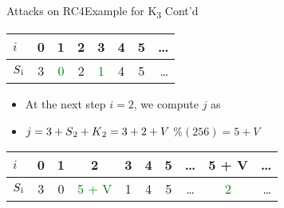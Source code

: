 \documentclass[
	aspectratio=169,	%
	onlytextwidth,		%
	t,					%
	]{beamer}
\begin{document}
\begin{frame}[fragile]{Attacks on RC4}{Example for K\textsubscript{3} Cont'd}

	\begin{table}[h!]
		\begin{center}
			\begin{tabular}{l|c|c|c|c|c|c|r}
			$i$ & 0 & 1 & 2 & 3 & 4 & 5 & \dots\\
			\hline
			$S\textsubscript{i}$ & 3 & \textcolor{green}{0} & 2 & \textcolor{green}{1} & 4 & 5 & \dots\\
			\end{tabular}
		\end{center}
	\end{table}

	\begin{itemize}
		\item At the next step $i = 2$, we compute $j$ as
		\item $j = 3 + S\textsubscript{2} + K\textsubscript{2} = 3 + 2 + V$ $\% (256) = 5+V$
	\end{itemize}

	\begin{table}[h!]
		\begin{center}
			\begin{tabular}{l|c|c|c|c|c|c|c|c|r}
			$i$ & 0 & 1 & 2 & 3 & 4 & 5 & \dots & 5 + V & \dots\\
			\hline
			$S\textsubscript{i}$ & 3 & 0 & \textcolor{green}{5 + V} & 1 & 4 & 5 & \dots & \textcolor{green}{2} & \dots\\
			\end{tabular}
		\end{center}
	\end{table}

\end{frame}
\end{document}
